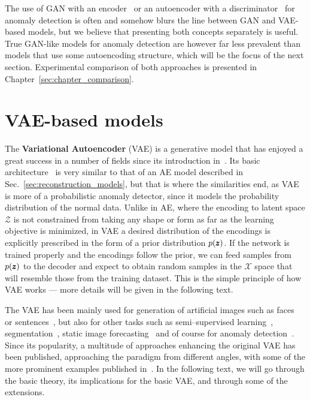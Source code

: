 The use of GAN with an encoder~\cite{donahue2016adversarial} or an autoencoder with a discriminator~\cite{leveau2017adversarial} for anomaly detection is often and somehow blurs the line between GAN and VAE-based models, but we believe that presenting both concepts separately is useful. True GAN-like models for anomaly detection are however far less prevalent than models that use some autoencoding structure, which will be the focus of the next section. Experimental comparison of both approaches is presented in Chapter~\ref{sec:chapter_comparison}.

\section{VAE-based models} \label{sec:vae_models}
The \textbf{Variational Autoencoder} (VAE) is a generative model that has enjoyed a great success in a number of fields since its introduction in~\cite{kingma2013vae}. Its basic architecture~\cite{kingma2019introduction} is very similar to that of an AE model described in Sec.~\ref{sec:reconstruction_models}, but that is where the similarities end, as VAE is more of a probabilistic anomaly detector, since it models the probability distribution of the normal data. Unlike in AE, where the encoding to latent space $\mathcal{Z}$ is not constrained from taking any shape or form as far as the learning objective is minimized, in VAE a desired distribution of the encodings is explicitly prescribed in the form of a prior distribution $p(\pmb{{z}})$. If the network is trained properly and the encodings follow the prior, we can feed samples from $p(\pmb{{z}})$ to the decoder and expect to obtain random samples in the $\mathcal{X}$ space that will resemble those from the training dataset. This is the simple principle of how VAE works --- more details will be given in the following text.

The VAE has been mainly used for generation of artificial images such as faces~\cite{rezende2014stochastic} or sentences~\cite{bowman2015generating}, but also for other tasks such as semi--supervised learning~\cite{kingma2014semi}, segmentation~\cite{sohn2015learning}, static image forecasting~\cite{walker2016uncertain} and of course for anomaly detection~\cite{an2015variational,xu2018unsupervised,solch2016variational}. Since its popularity, a multitude of approaches enhancing the original VAE has been published, approaching the paradigm from different angles, with some of the more prominent examples published in~\cite{higgins2017beta,zhao2017infovae,tolstikhin2017wasserstein,makhzani2015adversarial,pu2017adversarial}. In the following text, we will go through the basic theory, its implications for the basic VAE, and through some of the extensions. 

